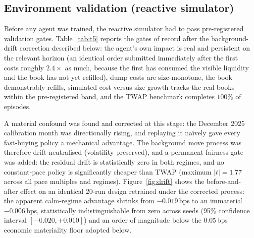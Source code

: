 \documentclass[11pt]{article}
\begin{document}
\subsection{Environment validation (reactive simulator)}

Before any agent was trained, the reactive simulator had to pass pre-registered validation
gates. Table~\ref{tab:t5} reports the gates of record after the background-drift correction
described below: the agent's own impact is real and persistent on the relevant horizon
(an identical order submitted immediately after the first costs roughly $2.4\times$ as
much, because the first has consumed the visible liquidity and the book has not yet
refilled), dump costs are size-monotone, the book demonstrably refills, simulated
cost-versus-size growth tracks the real books within the pre-registered band, and the TWAP
benchmark completes $100\%$ of episodes.

A material confound was found and corrected at this stage: the December 2025 calibration
month was directionally rising, and replaying it na\"ively gave every fast-buying policy a
mechanical advantage. The background move process was therefore drift-neutralised (volatility
preserved), and a permanent fairness gate was added: the residual drift is statistically zero
in both regimes, and no constant-pace policy is significantly cheaper than TWAP (maximum
$|t| = 1.77$ across all pace multiples and regimes). Figure~\ref{fig:drift} shows the
before-and-after effect on an identical 20-run design retrained under the corrected
process: the apparent calm-regime advantage shrinks from $-0.019$\,bps to an immaterial
$-0.006$\,bps, statistically indistinguishable from zero across seeds (95\% confidence
interval $[-0.020, +0.010]$) and an order of magnitude below the $0.05$\,bps economic
materiality floor adopted below.

\begin{table}[h]\centering\small
\caption{Environment validation gates of record after drift correction. Rows one to
three verify that the agent's own trading genuinely moves the simulated market and that the
book both remembers and recovers from the impact; row four that simulated cost growth with
order size matches the real order book; rows five and six that the TWAP benchmark operates
correctly and that immediate execution is properly penalised; the final two rows that the
corrected background process gives no schedule a mechanical advantage. Archived records:
\texttt{step4\_gates\_v3.json} and \texttt{step3g/fairness\_verdict\_*.json}, in which these
checks carry the internal identifiers G1$'$, G2, G3 and the fairness gate, in row order.}
\label{tab:t5}
\resizebox{\textwidth}{!}{}
\end{table}
\end{document}
